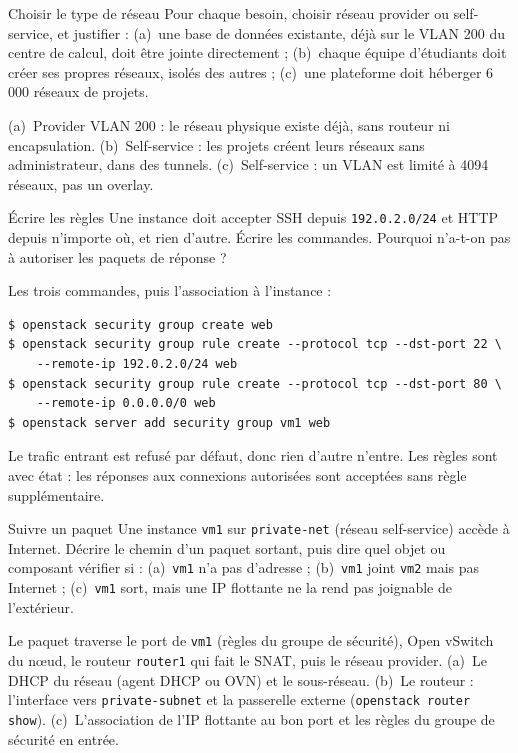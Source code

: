 \begin{exercice}{Choisir le type de réseau}\label{ex:neu-types}
Pour chaque besoin, choisir réseau provider ou self-service, et justifier : (a)~une base de données existante, déjà sur
le VLAN 200 du centre de calcul, doit être jointe directement ; (b)~chaque équipe d'étudiants doit créer ses propres
réseaux, isolés des autres ; (c)~une plateforme doit héberger 6\,000 réseaux de projets.
\end{exercice}
\begin{correction}
(a)~Provider VLAN 200 : le réseau physique existe déjà, sans routeur ni encapsulation. (b)~Self-service : les projets
créent leurs réseaux sans administrateur, dans des tunnels. (c)~Self-service : un VLAN est limité à 4094 réseaux, pas un
overlay.
\end{correction}

\begin{exercice}{Écrire les règles}\label{ex:neu-regles}
Une instance doit accepter SSH depuis \texttt{192.0.2.0/24} et HTTP depuis n'importe où, et rien d'autre. Écrire les
commandes. Pourquoi n'a-t-on pas à autoriser les paquets de réponse ?
\end{exercice}
\begin{correction}
Les trois commandes, puis l'association à l'instance :
\begin{lstlisting}[style=terminal]
$ openstack security group create web
$ openstack security group rule create --protocol tcp --dst-port 22 \
    --remote-ip 192.0.2.0/24 web
$ openstack security group rule create --protocol tcp --dst-port 80 \
    --remote-ip 0.0.0.0/0 web
$ openstack server add security group vm1 web
\end{lstlisting}
Le trafic entrant est refusé par défaut, donc rien d'autre n'entre. Les règles sont avec état : les réponses aux
connexions autorisées sont acceptées sans règle supplémentaire.
\end{correction}

\begin{exercice}{Suivre un paquet}\label{ex:neu-chemin}
Une instance \texttt{vm1} sur \texttt{private-net} (réseau self-service) accède à Internet. Décrire le chemin d'un paquet
sortant, puis dire quel objet ou composant vérifier si : (a)~\texttt{vm1} n'a pas d'adresse ; (b)~\texttt{vm1} joint
\texttt{vm2} mais pas Internet ; (c)~\texttt{vm1} sort, mais une IP flottante ne la rend pas joignable de l'extérieur.
\end{exercice}
\begin{correction}
Le paquet traverse le port de \texttt{vm1} (règles du groupe de sécurité), Open vSwitch du nœud, le routeur
\texttt{router1} qui fait le SNAT, puis le réseau provider. (a)~Le DHCP du réseau (agent DHCP ou OVN) et le sous-réseau.
(b)~Le routeur : l'interface vers \texttt{private-subnet} et la passerelle externe (\texttt{openstack router show}). (c)~L'association
de l'IP flottante au bon port et les règles du groupe de sécurité en entrée.
\end{correction}

